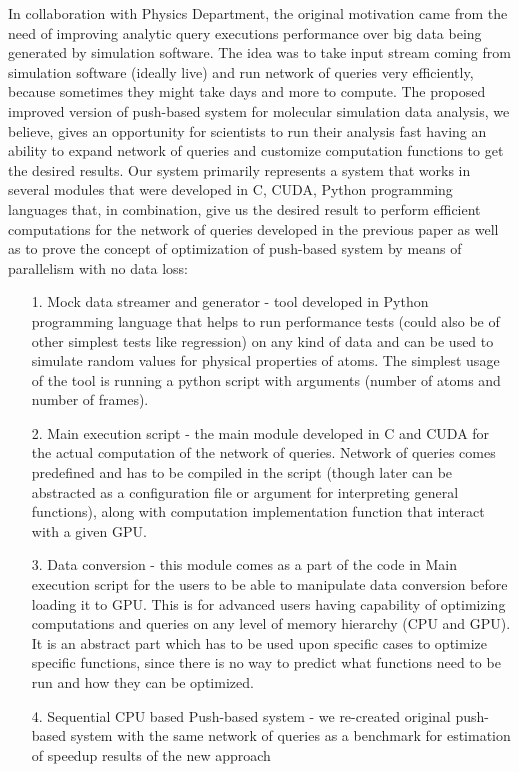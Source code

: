 \documentclass[12pt,letterpaper]{report}
\begin{document}
\hspace{3em} In collaboration with Physics Department, the original motivation came from the need of improving analytic query executions performance over big data being generated by simulation software. The idea was to take input stream coming from simulation software (ideally live) and run network of queries very efficiently, because sometimes they might take days and more to compute. The proposed improved version of push-based system for molecular simulation data analysis, we believe, gives an opportunity for scientists to run their analysis fast having an ability to expand network of queries and customize computation functions to get the desired results. 
Our system primarily represents a system that works in several modules that were developed in C, CUDA, Python programming languages that, in combination, give us the desired result to perform efficient computations for the network of queries developed in the previous paper \cite{mainPaper} as well as to prove the concept of optimization of push-based system by means of parallelism with no data loss:

\begin{itemize}
\item[1.] Mock data streamer and generator - tool developed in Python programming language that helps to run performance tests (could also be of other simplest tests like regression) on any kind of data and can be used to simulate random values for physical properties of atoms. The simplest usage of the tool is running a python script with arguments (number of atoms and number of frames).
\item[2.] Main execution script - the main module developed in C and CUDA for the actual computation of the network of queries. Network of queries comes predefined and has to be compiled in the script (though later can be abstracted as a configuration file or argument for interpreting general functions), along with computation implementation function that interact with a given GPU.
\item[3.] Data conversion - this module comes as a part of the code in Main execution script for the users to be able to manipulate data conversion before loading it to GPU. This is for advanced users having capability of optimizing computations and queries on any level of memory hierarchy (CPU and GPU). It is an abstract part which has to be used upon specific cases to optimize specific functions, since there is no way to predict what functions need to be run and how they can be optimized.
\item[4.] Sequential CPU based Push-based system - we re-created original push-based system with the same network of queries as a benchmark for estimation of speedup results of the new approach

\end{itemize}
\end{document}
